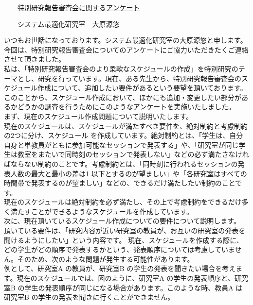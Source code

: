 \documentclass[a4j]{jarticle}
\begin{document}
%
\begin{center}
　　{\Large \underline{特別研究報告審査会に関するアンケート}}
\end{center}
\begin{flushright}
　　{\normalsize システム最適化研究室　大原源悠}
\end{flushright}
%

いつもお世話になっております。システム最適化研究室の大原源悠と申します。今回は、特別研究報告審査会についてのアンケートにご協力いただきたくご連絡させて頂きました。\\

私は、「特別研究報告審査会のより柔軟なスケジュールの作成」を特別研究のテーマとし、研究を行っています。現在、ある先生から、特別研究報告審査会のスケジュール作成について、追加したい要件があるという要望を頂いております。このことから、スケジュール作成において、ほかにも追加・変更したい部分があるかどうかの調査を行うためにこのようなアンケートを実施いたしました。\\

まず、現在のスケジュール作成問題について説明いたします。\\
現在のスケジュールは、スケジュールが満たすべき要件を、絶対制約と考慮制約の$2$つに分け、スケジュール
を作成しています。絶対制約とは、「学生は、自分自身と単教員がともに参加可能なセッションで発表する」や、「研究室が同じ学生は教室をまたいで同時刻のセッションで発表しない」などの必ず満たさなければならない制約のことです。考慮制約とは、「同時刻に行われるセッションの発表人数の最大と最小の差は1 以下とするのが望ましい」や「各研究室はすべての時間帯で発表するのが望ましい」などの、できるだけ満たしたい制約のことです。\\

現在のスケジュールは絶対制約を必ず満たし、その上で考慮制約をできるだけ多く満たすことができるようなスケジュールを作成しています。\\


次に、現在頂いているスケジュール作成についての要件について説明します。\\
頂いている要件は、「研究内容が近い研究室の教員が、お互いの研究室の発表を聞けるようにしたい」という内容です。
現在、スケジュールを作成する際に、どの学生がどの順序で発表するかという、発表順序については考慮していません。そのため、次のような問題が発生する可能性があります。\\

例として、研究室A の教員が、研究室B の学生の発表を聞きたい場合を考えます。現在のスケジュールでは、図のように、研究室A の学生の発表順序と、研究室B の学生の発表順序が同じになる場合があります。このような時、教員A は研究室B の学生の発表を聞きに行くことができません。\\
\end{document}
